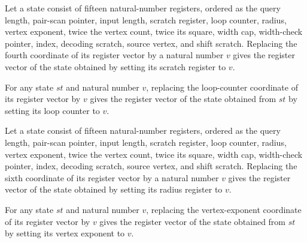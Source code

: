 \begin{lemma}
\label{Complexity.PathHard.St.upd_t}
\leanok
{}
Let a state consist of fifteen natural-number registers, ordered as the query length,
pair-scan pointer, input length, scratch register, loop counter, radius, vertex
exponent, twice the vertex count, twice its square, width cap, width-check pointer,
index, decoding scratch, source vertex, and shift scratch. Replacing the fourth
coordinate of its register vector by a natural number $v$ gives the register vector of
the state obtained by setting its scratch register to $v$.
\end{lemma}

\begin{lemma}
\label{Complexity.PathHard.St.upd_c}
\leanok
{}
For any state $st$ and natural number $v$, replacing the loop-counter coordinate of its
register vector by $v$ gives the register vector of the state obtained from $st$ by
setting its loop counter to $v$.
\end{lemma}

\begin{lemma}
\label{Complexity.PathHard.St.upd_s}
\leanok
{}
Let a state consist of fifteen natural-number registers, ordered as the query length,
pair-scan pointer, input length, scratch register, loop counter, radius, vertex
exponent, twice the vertex count, twice its square, width cap, width-check pointer,
index, decoding scratch, source vertex, and shift scratch. Replacing the sixth
coordinate of its register vector by a natural number $v$ gives the register vector of
the state obtained by setting its radius register to $v$.
\end{lemma}

\begin{lemma}
\label{Complexity.PathHard.St.upd_e}
\leanok
{}
For any state $st$ and natural number $v$, replacing the vertex-exponent coordinate of
its register vector by $v$ gives the register vector of the state obtained from $st$ by
setting its vertex exponent to $v$.
\end{lemma}

